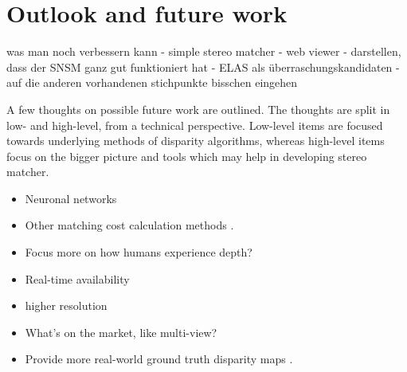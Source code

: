 \section{Outlook and future work}





was man noch verbessern kann
- simple stereo matcher
- web viewer
- darstellen, dass der SNSM ganz gut funktioniert hat
- ELAS als überraschungskandidaten
- auf die anderen vorhandenen stichpunkte bisschen eingehen





A few thoughts on possible future work are outlined.
The thoughts are split in low- and high-level, from a technical perspective.
Low-level items are focused towards underlying methods of disparity algorithms, whereas high-level items focus on the bigger picture and tools which may help in developing stereo matcher.

\begin{itemize}
  \item Neuronal networks \citep{olshausen1996emergence}
  \item Other matching cost calculation methods \citep{hermann2010gradient}.
  \item Focus more on how humans experience depth? \citep{deangelis1995neuronal}
\end{itemize}

\begin{itemize}
  \item Real-time availability
  \item higher resolution
  \item What's on the market, like multi-view?
  \item Provide more real-world ground truth disparity maps \citep{kondermann2015stereo, Geiger2011IV}.
\end{itemize}
